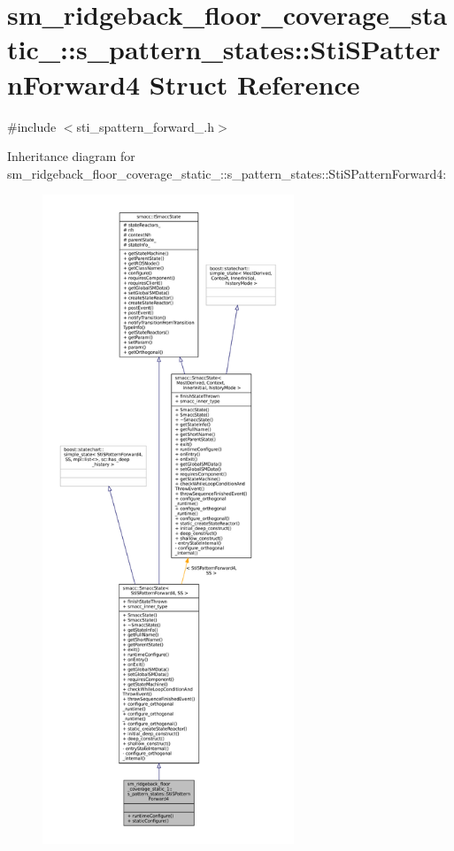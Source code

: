 \hypertarget{structsm__ridgeback__floor__coverage__static__1_1_1s__pattern__states_1_1StiSPatternForward4}{}\section{sm\+\_\+ridgeback\+\_\+floor\+\_\+coverage\+\_\+static\+\_\+:\+:s\+\_\+pattern\+\_\+states\+:\+:Sti\+S\+Pattern\+Forward4 Struct Reference}
\label{structsm__ridgeback__floor__coverage__static__1_1_1s__pattern__states_1_1StiSPatternForward4}


{\ttfamily \#include $<$sti\+\_\+spattern\+\_\+forward\+\_.\+h$>$}



Inheritance diagram for sm\+\_\+ridgeback\+\_\+floor\+\_\+coverage\+\_\+static\+\_\+:\+:s\+\_\+pattern\+\_\+states\+:\+:Sti\+S\+Pattern\+Forward4\+:
\nopagebreak
\begin{figure}[H]
\begin{center}
\leavevmode
\includegraphics[height=550pt]{structsm__ridgeback__floor__coverage__static__1_1_1s__pattern__states_1_1StiSPatternForward4__inherit__graph}
\end{center}
\end{figure}


